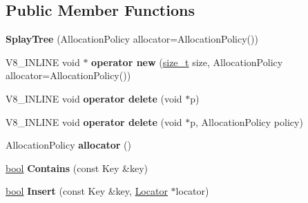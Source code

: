 \subsection*{Public Member Functions}
\begin{DoxyCompactItemize}
\item 
\mbox{\label{classv8_1_1internal_1_1SplayTree_a32079df13e173728baa4e30b22835155}} 
{\bfseries Splay\+Tree} (Allocation\+Policy allocator=Allocation\+Policy())
\item 
\mbox{\label{classv8_1_1internal_1_1SplayTree_af4ee22fb6484bf8101ec645947373fe7}} 
V8\+\_\+\+I\+N\+L\+I\+NE void $\ast$ {\bfseries operator new} (\mbox{\hyperlink{classsize__t}{size\+\_\+t}} size, Allocation\+Policy allocator=Allocation\+Policy())
\item 
\mbox{\label{classv8_1_1internal_1_1SplayTree_ab53e46664c782b145822d6348575334e}} 
V8\+\_\+\+I\+N\+L\+I\+NE void {\bfseries operator delete} (void $\ast$p)
\item 
\mbox{\label{classv8_1_1internal_1_1SplayTree_ab1b1e1545d50ab4ebf93774cdf9b9b5a}} 
V8\+\_\+\+I\+N\+L\+I\+NE void {\bfseries operator delete} (void $\ast$p, Allocation\+Policy policy)
\item 
\mbox{\label{classv8_1_1internal_1_1SplayTree_a1f246b50b6918ac8dd2651817ab43b20}} 
Allocation\+Policy {\bfseries allocator} ()
\item 
\mbox{\label{classv8_1_1internal_1_1SplayTree_a2df37e47951b6090ecd2787663a96ab3}} 
\mbox{\hyperlink{classbool}{bool}} {\bfseries Contains} (const Key \&key)
\item 
\mbox{\label{classv8_1_1internal_1_1SplayTree_aeadaecb47733848fb6b6eb835b9a729c}} 
\mbox{\hyperlink{classbool}{bool}} {\bfseries Insert} (const Key \&key, \mbox{\hyperlink{classv8_1_1internal_1_1SplayTree_1_1Locator}{Locator}} $\ast$locator)
\item 
\mbox{\label{classv8_1_1internal_1_1SplayTree_ad055e7fd298d8c50d7772584469bda67}} 

\end{DoxyCompactItemize}
